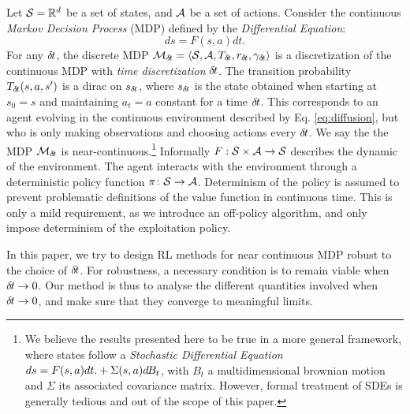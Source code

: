       
        Let ${\cal S} = \mathbb{R}^d$ be a set of states, and ${\cal A}$ be a set of
	actions. Consider the continuous \emph{Markov Decision Process} (MDP) defined by the \emph{Differential Equation}: %
        \begin{equation}
		\label{eq:diffusion}
		ds = F(s, a)dt. %
              \end{equation}
        For any ${\delta\hspace{-.1em}t}$, the discrete MDP ${\cal
	M}_{\delta\hspace{-.1em}t} = \langle {\cal S}, {\cal A}, T_{{\delta\hspace{-.1em}t}}, r_{\delta\hspace{-.1em}t},
      \gamma_{\delta\hspace{-.1em}t}\rangle$ is a discretization of the continuous MDP with
      \emph{time discretization} ${\delta\hspace{-.1em}t}$. The transition probability
      $T_{\delta\hspace{-.1em}t}(s, a, s')$ is a dirac on $s_{\delta\hspace{-.1em}t}$, where $s_{\delta\hspace{-.1em}t}$ is the
      state obtained
      when starting at $s_0 = s$ and maintaining $a_t=a$ constant for a time
      ${\delta\hspace{-.1em}t}$.
      This corresponds to an agent evolving in the continuous
      environment described by Eq. \eqref{eq:diffusion}, but who is
      only making observations and choosing actions every ${\delta\hspace{-.1em}t}$. We
      say the the MDP ${\cal M}_{\delta\hspace{-.1em}t}$ is near-continuous.\footnote{
	      We believe the results presented here to be true in a more general framework, where states
	      follow a \emph{Stochastic Differential Equation} $ds = F(s, a)dt.  + \Sigma(s, a)d\hspace{-.1em}B_t$, with
	      $B_t$ a multidimensional brownian motion and $\Sigma$ its associated covariance matrix. However,
      formal treatment of SDEs is generally tedious and out of the scope of this paper.}
      Informally $F: {\cal S}\times{\cal A}\rightarrow {\cal S}$ describes
	the dynamic of the environment. The agent interacts with the environment through a deterministic policy function
	$\pi \colon {\cal S} \rightarrow {\cal A}$. Determinism of the policy is assumed to prevent problematic definitions
	of the value function in continuous time. This is only a mild requirement, as we introduce an off-policy algorithm,
	and only impose determinism of the exploitation policy.

        In this paper, we try to design RL methods for near continuous MDP
	robust to the choice of ${\delta\hspace{-.1em}t}$. For robustness, a necessary condition is to remain viable when ${\delta\hspace{-.1em}t} \rightarrow 0$. Our method is thus to analyse the different
	quantities involved when ${\delta\hspace{-.1em}t} \rightarrow 0$, and make sure that they converge to meaningful limits.

